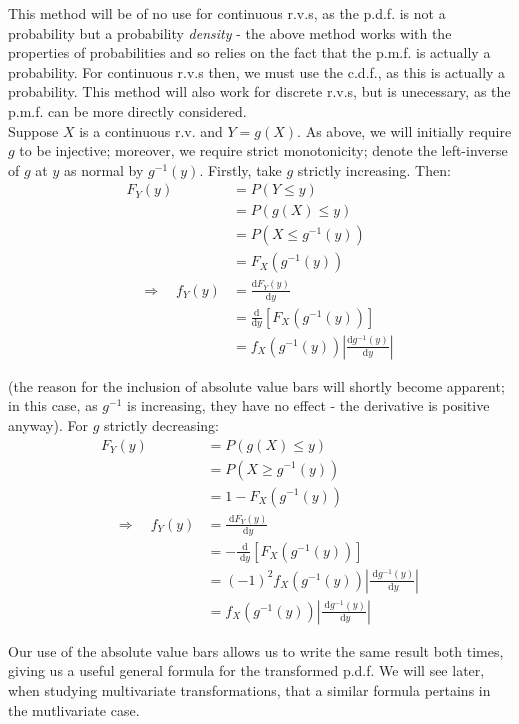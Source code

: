 \documentclass[12pt,a4paper]{article}
\newcommand{\imply}{\quad\Rightarrow\quad}
\newcommand{\diff}{\;\mathrm{d}}
\begin{document}
This method will be of no use for continuous r.v.s, as the p.d.f. is not a probability but a probability {\it density} - the above method works with the properties of probabilities and so relies on the fact that the p.m.f. is actually a probability. For continuous r.v.s then, we must use the c.d.f., as this is actually a probability. This method will also work for discrete r.v.s, but is unecessary, as the p.m.f. can be more directly considered.\\
\indent Suppose $X$ is a continuous r.v. and $Y = g(X)$. As above, we will initially require $g$ to be injective; moreover, we require strict monotonicity; denote the left-inverse of $g$ at $y$ as normal by $g^{-1}(y)$. Firstly, take $g$ strictly increasing. Then:
\begin{align*}
F_Y(y) &= P(Y \leq y)\\
&= P(g(X) \leq y)\\
&= P\left(X \leq g^{-1}(y)\right)\\
&= F_X\left(g^{-1}(y)\right)\\
\imply f_Y(y) &= \frac{\mathrm{d}F_Y(y)}{\mathrm{d}y}\\
&= \frac{\mathrm{d}}{\mathrm{d}y}\left[F_X\left(g^{-1}(y)\right)\right]\\
&= f_X\left(g^{-1}(y)\right) \left|\frac{\mathrm{d}g^{-1}(y)}{\mathrm{d}y}\right|
\end{align*}

(the reason for the inclusion of absolute value bars will shortly become apparent; in this case, as $g^{-1}$ is increasing, they have no effect - the derivative is positive anyway). For $g$ strictly decreasing:
\begin{align*}
F_Y(y) &= P(g(X)\leq y)\\
&= P(X\geq g^{-1}(y))\\
&= 1 - F_X(g^{-1}(y))\\
\imply f_Y(y) &= \frac{\diff F_Y(y)}{\diff y}\\
&= -\frac{\diff}{\diff y}\left[F_X(g^{-1}(y))\right]\\
&= (-1)^2 f_X(g^{-1}(y))\left| \frac{\diff g^{-1}(y)}{\diff y}\right| \\
&= f_X(g^{-1}(y))\left|\frac{\diff g^{-1}(y)}{\diff y}\right|
\end{align*}

Our use of the absolute value bars allows us to write the same result both times, giving us a useful general formula for the transformed p.d.f. We will see later, when studying multivariate transformations, that a similar formula pertains in the mutlivariate case.
\end{document}
